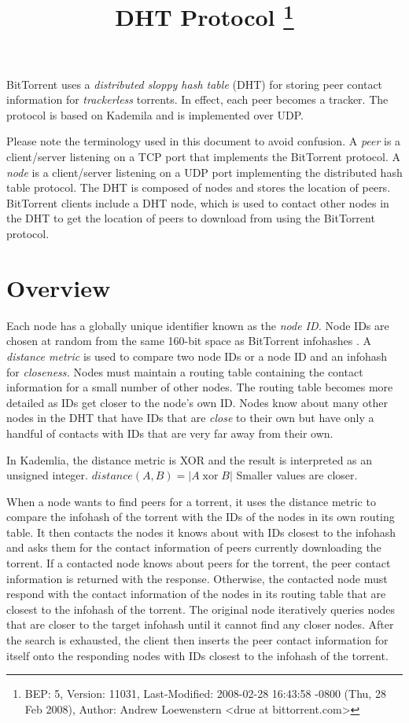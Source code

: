\documentclass{article}
\DeclareMathOperator{\xor}{xor}
\begin{document}
\title{
  DHT Protocol
  \footnote{
    BEP: 5, Version:  11031, Last-Modified: 2008-02-28 16:43:58 -0800 (Thu, 28 Feb 2008),
    Author: Andrew Loewenstern <drue at bittorrent.com>
  }
}
\maketitle
\tableofcontents
\pagebreak

\setlength{\parskip}{1ex plus 0.5ex minus 0.2ex}

BitTorrent uses a {\em distributed sloppy hash table} (DHT) for storing peer contact information for {\em trackerless} torrents. In effect, each peer becomes a tracker. The protocol is based on Kademila \cite{Kademlia} and is implemented over UDP.

Please note the terminology used in this document to avoid confusion. A {\em peer} is a client/server listening on a TCP port that implements the BitTorrent protocol. A {\em node} is a client/server listening on a UDP port implementing the distributed hash table protocol. The DHT is composed of nodes and stores the location of peers. BitTorrent clients include a DHT node, which is used to contact other nodes in the DHT to get the location of peers to download from using the BitTorrent protocol.

{\section {Overview}}

Each node has a globally unique identifier known as the {\em node ID.} Node IDs are chosen at random from the same 160-bit space as BitTorrent infohashes \cite{SHA1}. A {\em distance metric} is used to compare two node IDs or a node ID and an infohash for {\em closeness.} Nodes must maintain a routing table containing the contact information for a small number of other nodes. The routing table becomes more detailed as IDs get closer to the node's own ID. Nodes know about many other nodes in the DHT that have IDs that are {\em close} to their own but have only a handful of contacts with IDs that are very far away from their own.

In Kademlia, the distance metric is XOR and the result is interpreted as an unsigned integer. $distance(A,B) = |A \xor B|$ Smaller values are closer.

When a node wants to find peers for a torrent, it uses the distance metric to compare the infohash of the torrent with the IDs of the nodes in its own routing table. It then contacts the nodes it knows about with IDs closest to the infohash and asks them for the contact information of peers currently downloading the torrent. If a contacted node knows about peers for the torrent, the peer contact information is returned with the response. Otherwise, the contacted node must respond with the contact information of the nodes in its routing table that are closest to the infohash of the torrent. The original node iteratively queries nodes that are closer to the target infohash until it cannot find any closer nodes. After the search is exhausted, the client then inserts the peer contact information for itself onto the responding nodes with IDs closest to the infohash of the torrent.
\end{document}
